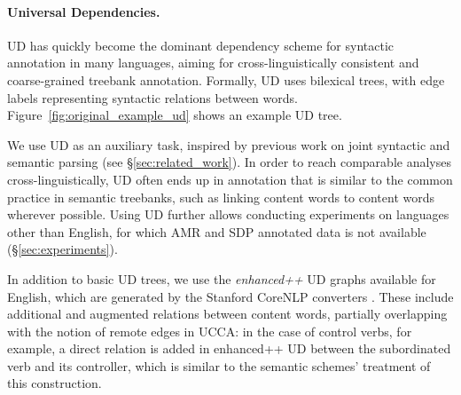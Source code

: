 \documentclass[11pt,a4paper]{article}
\begin{document}
\paragraph{Universal Dependencies.}\label{sec:ud}
UD \cite{nivre2016universal,11234/1-2515} has quickly become
the dominant dependency scheme for
syntactic  annotation in many languages,
aiming for cross-linguistically consistent and coarse-grained treebank
annotation. Formally, UD uses bilexical trees, with edge labels 
representing syntactic relations between words.
Figure~\ref{fig:original_example_ud} shows an example UD tree.

We use UD as an auxiliary task,
inspired by previous work on joint syntactic and semantic parsing
(see \S\ref{sec:related_work}).
In order to reach comparable analyses cross-linguistically,
UD often ends up in annotation that is similar to the common practice
in semantic treebanks, such as linking content words to content words wherever possible.
Using UD further allows conducting experiments on languages other than English, 
for which AMR and SDP annotated data is not available (\S\ref{sec:experiments}).

In addition to basic UD trees, we use the \textit{enhanced++} UD graphs available for English,
which are generated by the Stanford CoreNLP converters \cite{SCHUSTER16.779}.
These include additional and augmented relations between content words,
partially overlapping with the notion of remote edges in UCCA:
in the case of control verbs, for example, a direct relation is added in 
enhanced++ UD between the subordinated verb and its controller,
which is similar to the semantic schemes' treatment of this construction.
\end{document}
